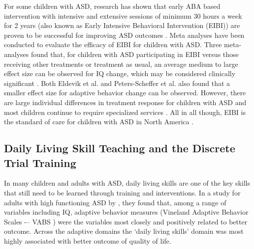 For some children with ASD, research has shown that early ABA based intervention with intensive and extensive sessions of minimum 30 hours a week for 2 years (also known as Early Intensive Behavioral Intervention (EIBI)) are proven to be successful for improving ASD outcomes \cite{howlin2009systematic}.  Meta analyses have been conducted to evaluate the efficacy of EIBI for children with ASD.  Three meta-analyses \cite{eldevik2009meta, reichow2009comprehensive, peters2011meta} found that, for children with ASD participating in EIBI versus those receiving other treatments or treatment as usual, an average medium to large effect size can be observed for IQ change, which may be considered clinically significant \cite{hojat2004visitor}.  Both Eldevik et al. \cite{eldevik2009meta} and Peters-Scheffer et al. \cite{peters2011meta} also found that a smaller effect size for adaptive behavior change can be observed.  However, there are large individual differences in treatment response for children with ASD and most children continue to require specialized services \cite{thill2012robot}.  All in all though, EIBI is the standard of care for children with ASD in North America \cite{keenan2014autism}.

\subsection{Daily Living Skill Teaching and the Discrete Trial Training}
In many children and adults with ASD, daily living skills are one of the key skills that still need to be learned through training and interventions.  In a study for adults with high functioning ASD by \cite{farley2009twenty}, they found that, among a range of variables including IQ, adaptive behavior measures (Vineland Adaptive Behavior Scales -– VABS \cite{sparrow2005vineland}) were the variables most closely and positively related to better outcome. Across the adaptive domains the ‘daily living skills’ domain was most highly associated with better outcome of quality of life.

